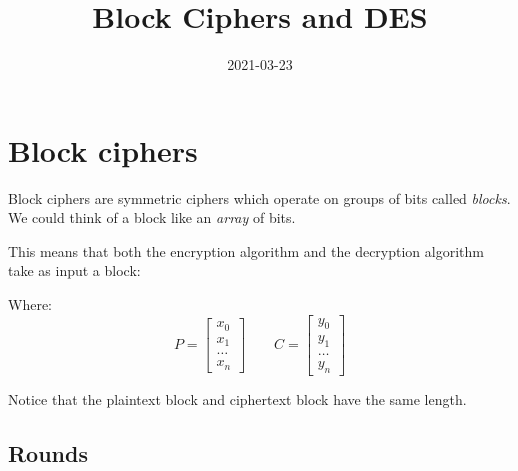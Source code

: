 \documentclass{article}
\title{Block Ciphers and DES}
\author{}
\date{2021-03-23}
\begin{document}
  \maketitle 
  \tableofcontents
  \break

  \section{Block ciphers}

  Block ciphers are symmetric ciphers which operate on groups of bits
  called \emph{blocks}.
  We could think of a block like an \emph{array} of bits.
  
  This means that both the encryption algorithm and the decryption
  algorithm take as input a block:

  \begin{center}
  \end{center}

  \begin{center}
  \end{center}

  Where:
  $$
	P = 
	\begin{bmatrix}
	  x_{0} \\
	  x_{1} \\
	  \dots \\
	  x_{n}
	\end{bmatrix}
	\qquad
	C = 
	\begin{bmatrix}
	  y_{0} \\
	  y_{1} \\
	  \dots \\
	  y_{n}
	\end{bmatrix}
  $$

  Notice that the plaintext block and ciphertext block have the same
  length.

  \subsection{Rounds}
\end{document}
